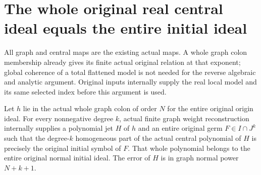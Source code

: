 \section{The whole original real central ideal equals the entire initial ideal}

All graph and central maps are the existing actual maps. A whole graph
colon membership already gives its finite actual original relation at that
exponent; global coherence of a total flattened model is not needed for the
reverse algebraic and analytic argument. Original inputs internally supply
the real local model and its same selected index before this argument is used.

\begin{lemma}
\label{hir:real-domain-all-graph-colon-original-central-symbols}
\leanok
Let $h$ lie in the actual whole graph colon of order $N$ for the entire
original origin ideal. For every nonnegative degree $k$, actual finite graph
weight reconstruction internally supplies a polynomial jet $H$ of $h$ and
an entire original germ $F\in I\cap J^k$ such that the degree-$k$ homogeneous
part of the actual central polynomial of $H$ is precisely the original
initial symbol of $F$. That whole polynomial belongs to the entire original
normal initial ideal. The error of $H$ is in graph normal power $N+k+1$.
\end{lemma}
